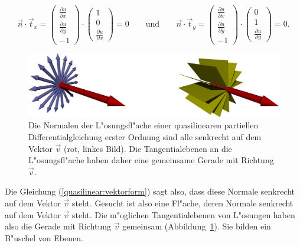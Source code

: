 \[
\vec n\cdot\vec t_x
=
\begin{pmatrix}
\frac{\partial u}{\partial x}\\
\frac{\partial u}{\partial y}\\
-1
\end{pmatrix}
\cdot
\begin{pmatrix}1\\0\\\frac{\partial u}{\partial x}\end{pmatrix}
=0
\qquad
\text{und}
\qquad
\vec n\cdot\vec t_y
=
\begin{pmatrix}
\frac{\partial u}{\partial x}\\
\frac{\partial u}{\partial y}\\
-1
\end{pmatrix}
\cdot
\begin{pmatrix}0\\1\\\frac{\partial u}{\partial y}\end{pmatrix}
=0.
\]
\begin{figure}
\begin{center}
\includegraphics[width=\hsize]{3d/normals.jpg}
\end{center}
\caption{Die Normalen der L"osungsfl"ache einer quasilinearen
partiellen Differentialgleichung erster Ordnung sind alle senkrecht
auf dem Vektor $\vec v$ (rot, linkes Bild). Die Tangentialebenen an
die L"osungsfl"ache haben daher eine gemeinsame Gerade mit Richtung $\vec v$.
\label{geometrie:normals}}
\end{figure}%
Die Gleichung (\ref{quasilinear:vektorform}) sagt also,
dass diese Normale senkrecht auf dem Vektor $\vec v$ steht.
Gesucht ist also eine Fl"ache, deren Normale senkrecht auf dem
Vektor $\vec v$ steht. Die m"oglichen Tangentialebenen von L"osungen
haben also die Gerade mit Richtung $\vec v$ gemeinsam
(Abbildung~\ref{geometrie:normals}).
Sie bilden ein B"uschel von Ebenen.

